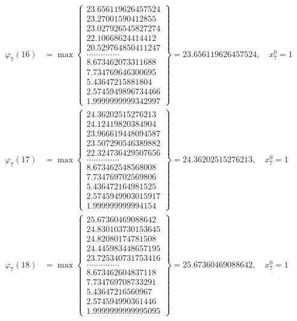 \documentclass{article}
\begin{document}
\begin{align*}
  
  
  
\varphi_{7}(16) &= \max \left\{ \begin{array}{c}
23.656119626457524 \\
 23.27001590412855 \\
 23.027926545827274 \\
 22.10668624414412 \\
 20.529764850411247 \\
 .............. \\
 8.673462073311688 \\
 7.734769646300695 \\
 5.43647215881804 \\
 2.5745949896734466 \\
 1.9999999999342997
\end{array} \right\} = 23.656119626457524, \quad x_{7}^0 = 1\\
  
  
  
  
\varphi_{7}(17) &= \max \left\{ \begin{array}{c}
24.36202515276213 \\
 24.12419820384904 \\
 23.966619448094587 \\
 23.507290546389882 \\
 22.324736429507656 \\
 .............. \\
 8.673462548568008 \\
 7.734769702569806 \\
 5.436472164981525 \\
 2.5745949903015917 \\
 1.999999999994154
\end{array} \right\} = 24.36202515276213, \quad x_{7}^0 = 1\\
  
  
  
  
\varphi_{7}(18) &= \max \left\{ \begin{array}{c}
25.67360469088642 \\
 24.830103730153645 \\
 24.82080174781508 \\
 24.445983448657195 \\
 23.725340731753416 \\
 .............. \\
 8.673462604837118 \\
 7.734769708733291 \\
 5.43647216560967 \\
 2.574594990361446 \\
 1.9999999999995095
\end{array} \right\} = 25.67360469088642, \quad x_{7}^0 = 1\\
  

\end{align*}
\end{document}
